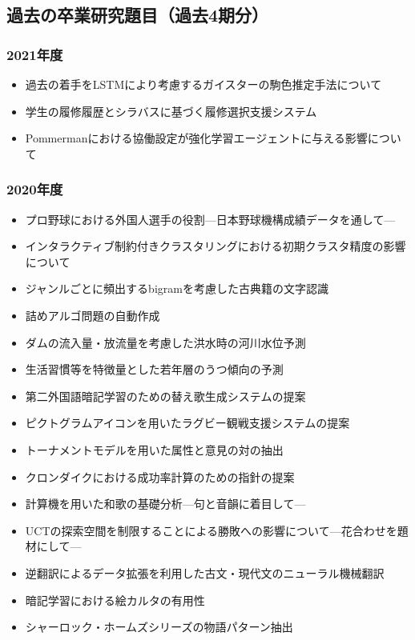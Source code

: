 \documentclass[uplatex,jis2004,a4paper,11pt]{jsarticle}
\begin{document}
\subsection*{過去の卒業研究題目（過去4期分）}
\vspace{-.5cm}
\begin{multicols}{2}
{\fontsize{9pt}{0mm}\selectfont
\subsubsection*{2021年度}
\begin{itemize}
  \item 過去の着手をLSTMにより考慮するガイスターの駒色推定手法について
  \item 学生の履修履歴とシラバスに基づく履修選択支援システム
  \item Pommermanにおける協働設定が強化学習エージェントに与える影響について
\end{itemize}
\vspace{-5mm}
\subsubsection*{2020年度}
\begin{itemize}
  \item プロ野球における外国人選手の役割---日本野球機構成績データを通して---
  \item インタラクティブ制約付きクラスタリングにおける初期クラスタ精度の影響について
  \item ジャンルごとに頻出するbigramを考慮した古典籍の文字認識
  \item 詰めアルゴ問題の自動作成
  \item ダムの流入量・放流量を考慮した洪水時の河川水位予測
  \item 生活習慣等を特徴量とした若年層のうつ傾向の予測
  \item 第二外国語暗記学習のための替え歌生成システムの提案
  \item ピクトグラムアイコンを用いたラグビー観戦支援システムの提案
  \item トーナメントモデルを用いた属性と意見の対の抽出
  \item クロンダイクにおける成功率計算のための指針の提案
  \item 計算機を用いた和歌の基礎分析---句と音韻に着目して---
  \item UCTの探索空間を制限することによる勝敗への影響について---花合わせを題材にして---
  \item 逆翻訳によるデータ拡張を利用した古文・現代文のニューラル機械翻訳
  \item 暗記学習における絵カルタの有用性
  \item シャーロック・ホームズシリーズの物語パターン抽出
\end{itemize}
\vspace{-5mm}
}
\end{multicols}
\end{document}
